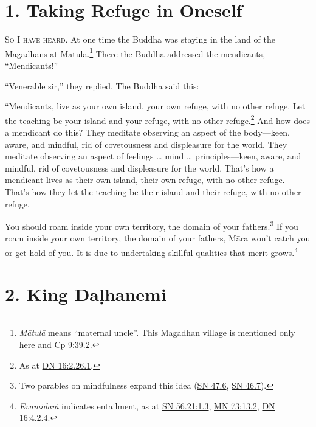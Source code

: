 \documentclass[12pt,openany]{book}%
\newcommand*{\scevam}[1]{\textsc{#1}}
\begin{document}
\section*{1. Taking Refuge in Oneself }

\scevam{So I have heard. }At one time the Buddha was staying in the land of the Magadhans at \textsanskrit{Mātulā}.\footnote{\textit{\textsanskrit{Mātulā}} means “maternal uncle”. This Magadhan village is mentioned only here and \href{https://suttacentral.net/cp9/en/sujato\#39.2}{Cp 9:39.2}. } There the Buddha addressed the mendicants, “Mendicants!” 

“Venerable sir,” they replied. The Buddha said this: 

“Mendicants, live as your own island, your own refuge, with no other refuge. Let the teaching be your island and your refuge, with no other refuge.\footnote{As at \href{https://suttacentral.net/dn16/en/sujato\#2.26.1}{DN 16:2.26.1}. } And how does a mendicant do this? They meditate observing an aspect of the body—keen, aware, and mindful, rid of covetousness and displeasure for the world. They meditate observing an aspect of feelings … mind … principles—keen, aware, and mindful, rid of covetousness and displeasure for the world. That’s how a mendicant lives as their own island, their own refuge, with no other refuge. That’s how they let the teaching be their island and their refuge, with no other refuge. 

You should roam inside your own territory, the domain of your fathers.\footnote{Two parables on mindfulness expand this idea (\href{https://suttacentral.net/sn47.6/en/sujato}{SN 47.6}, \href{https://suttacentral.net/sn46.7/en/sujato}{SN 46.7}). } If you roam inside your own territory, the domain of your fathers, \textsanskrit{Māra} won’t catch you or get hold of you. It is due to undertaking skillful qualities that merit grows.\footnote{\textit{\textsanskrit{Evamidaṁ}} indicates entailment, as at \href{https://suttacentral.net/sn56.21/en/sujato\#1.3}{SN 56.21:1.3}, \href{https://suttacentral.net/mn73/en/sujato\#13.2}{MN 73:13.2}, \href{https://suttacentral.net/dn16/en/sujato\#4.2.4}{DN 16:4.2.4}. } 

\section*{2. King \textsanskrit{Daḷhanemi} }
\end{document}
